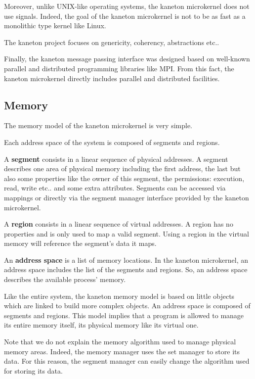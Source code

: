 \begin{multicols}{2}
Moreover, unlike UNIX-like operating systems, the kaneton microkernel does
not use signals. Indeed, the goal of the kaneton microkernel is not to
be as fast as a monolithic type kernel like Linux.

The kaneton project focuses on genericity, coherency, abstractions etc..

Finally, the kaneton message passing interface was designed based on
well-known parallel and distributed programming libraries like MPI. From
this fact, the kaneton microkernel directly includes parallel and
distributed facilities.

%
%

\subsection{Memory}

The memory model of the kaneton microkernel is very simple.

Each address space of the system is composed of segments and regions.

A \textbf{segment} consists in a linear sequence of physical addresses.
A segment describes one area of physical memory including the
first address, the last but also some properties like the owner of this
segment, the permissions: execution, read, write etc.. and some
extra attributes. Segments can be accessed via mappings or directly via
the segment manager interface provided by the kaneton microkernel.

A \textbf{region} consists in a linear sequence of virtual addresses.
A region has no properties and is only used to map a valid segment.
Using a region in the virtual memory will reference the segment's data
it maps.

An \textbf{address space} is a list of memory locations. In the kaneton
microkernel, an address space includes the list of the segments and regions.
So, an address space describes the available process' memory.

Like the entire system, the kaneton memory model is based on little objects
which are linked to build more complex objects. An address space is composed
of segments and regions. This model implies that a program is allowed to
manage its entire memory itself, its physical memory like its virtual one.

Note that we do not explain the memory algorithm used to manage
physical memory areas. Indeed, the memory manager uses the set manager
to store its data. For this reason, the segment manager can easily change
the algorithm used for storing its data.


\end{multicols}
